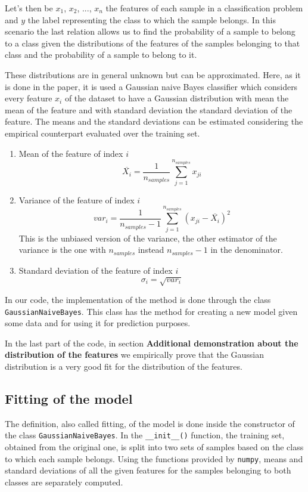 \documentclass{Configuration_Files/PoliMi3i_thesis}
\begin{document}
Let's then be $x_1$, $x_2$, ..., $x_n$ the features of each sample in a classification problem and $y$ the label representing the class to which the sample belongs. In this scenario the last relation allows us to find the probability of a sample to belong to a class given the distributions of the features of the samples belonging to that class and the probability of a sample to belong to it.

These distributions are in general unknown but can be approximated.
Here, as it is done in the paper, it is used a Gaussian naive Bayes classifier which considers every feature $x_i$ of the dataset to have a Gaussian distribution with mean the mean of the feature and with standard deviation the standard deviation of the feature. The means and the standard deviations can be estimated considering the empirical counterpart evaluated over the training set.
\begin{enumerate}
    \item Mean of the feature of index $i$
    $$\overline{X_i} = \frac{1}{n_{samples}}\sum_{j=1}^{n_{samples}}{x_{ji}}$$
    \item Variance of the feature of index $i$
    $$var_i = \frac{1}{n_{samples}-1}\sum_{j=1}^{n_{samples}}{(x_{ji}-\overline{X_i})^2}$$
    This is the unbiased version of the variance, the other estimator of the variance is the one with $n_{samples}$ instead $n_{samples}-1$ in the denominator.
    \item Standard deviation of the feature of index $i$
    $$\sigma_i = \sqrt{var_i}$$
\end{enumerate}

In our code, the implementation of the method is done through the class \verb|GaussianNaiveBayes|. This class has the method for creating a new model given some data and for using it for prediction purposes.

In the last part of the code, in section \textbf{Additional demonstration about the distribution of the features} we empirically prove that the Gaussian distribution is a very good fit for the distribution of the features.

\subsection{Fitting of the model}
The definition, also called fitting, of the model is done inside the constructor of the class \verb|GaussianNaiveBayes|.
In the \verb|__init__()| function, the training set, obtained from the original one, is split into two sets of samples based on the class to which each sample belongs.
Using the functions provided by \verb|numpy|, means and standard deviations of all the given features for the samples belonging to both classes are separately computed.
\end{document}
